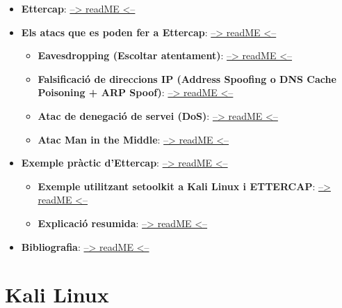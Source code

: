 \documentclass[]{article}
\begin{document}
\begin{itemize}
\item
  \textbf{Ettercap}: \protect\hyperlink{ettercap}{--\textgreater{}
  readME \textless{}--}
\item
  \textbf{Els atacs que es poden fer a Ettercap}:
  \protect\hyperlink{els-atacs-que-es-poden-fer-a-ettercap}{--\textgreater{}
  readME \textless{}--}

  \begin{itemize}
  \item
    \textbf{Eavesdropping (Escoltar atentament)}:
    \protect\hyperlink{eavesdropping-escoltar-atentament}{--\textgreater{}
    readME \textless{}--}
  \item
    \textbf{Falsificació de direccions IP (Address Spoofing o DNS Cache
    Poisoning + ARP Spoof)}:
    \protect\hyperlink{falsificaciuxf3-de-direccions-ip-address-spoofing-o-dns-cache-poisoning--arp-spoof}{--\textgreater{}
    readME \textless{}--}
  \item
    \textbf{Atac de denegació de servei (DoS)}:
    \protect\hyperlink{atac-de-denegaciuxf3-de-servei-dos}{--\textgreater{}
    readME \textless{}--}
  \item
    \textbf{Atac Man in the Middle}:
    \protect\hyperlink{atac-man-in-the-middle}{--\textgreater{} readME
    \textless{}--}
  \end{itemize}
\item
  \textbf{Exemple pràctic d'Ettercap}:
  \protect\hyperlink{exemple-pruxe0ctic-dettercap}{--\textgreater{}
  readME \textless{}--}

  \begin{itemize}
  \item
    \textbf{Exemple utilitzant \textbf{setoolkit} a Kali Linux i
    ETTERCAP}:
    \protect\hyperlink{exemple-1-utilitzant-setoolkit-a-kali-linux-i-ettercap}{--\textgreater{}
    readME \textless{}--}
  \item
    \textbf{Explicació resumida}:
    \protect\hyperlink{explicaciuxf3-resumida}{--\textgreater{} readME
    \textless{}--}
  \end{itemize}
\item
  \textbf{Bibliografia}:
  \protect\hyperlink{bibliografia}{--\textgreater{} readME
  \textless{}--}
\end{itemize}

\hypertarget{kali-linux}{%
\section{\texorpdfstring{\textbf{Kali
Linux}}{Kali Linux}}\label{kali-linux}}
\end{document}
